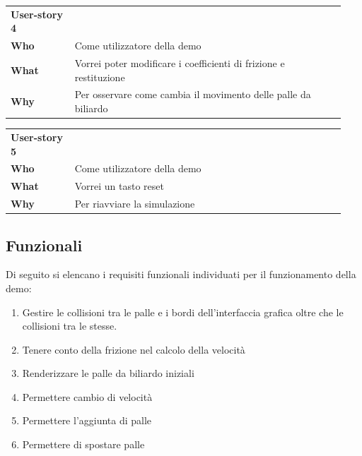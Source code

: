 \begin{table}[H]
    \begin{tabular}{p{0.18\linewidth}p{0.76\linewidth}}
        \toprule
        \textbf{User-story 4} &                                                                   \\
        \textbf{Who}          & Come utilizzatore della demo                                      \\
        \textbf{What}         & Vorrei poter modificare i coefficienti di frizione e restituzione \\
        \textbf{Why}          & Per osservare come cambia il movimento delle palle da biliardo    \\
        \bottomrule
    \end{tabular}\label{tab:user-story-4}
\end{table}
\begin{table}[H]
    \begin{tabular}{p{0.18\linewidth}p{0.76\linewidth}}
        \toprule
        \textbf{User-story 5} &                              \\
        \textbf{Who}          & Come utilizzatore della demo \\
        \textbf{What}         & Vorrei un tasto reset        \\
        \textbf{Why}          & Per riavviare la simulazione \\
        \bottomrule
    \end{tabular}\label{tab:user-story-5}
\end{table}

\subsection{Funzionali}\label{subsec:demo-funzionali}
Di seguito si elencano i requisiti funzionali individuati per il funzionamento della demo:
\begin{enumerate}[label=\textbf{\ref{subsec:demo-funzionali}.\arabic*}]
    \item \label{itm:df1} Gestire le collisioni tra le palle e i bordi dell'interfaccia grafica oltre che le collisioni
    tra le stesse.
    \item \label{itm:df2} Tenere conto della frizione nel calcolo della velocità
    \item \label{itm:df3} Renderizzare le palle da biliardo iniziali
    \item \label{itm:df4} Permettere cambio di velocità
    \item \label{itm:df5} Permettere l'aggiunta di palle
    \item \label{itm:df6} Permettere di spostare palle
\end{enumerate}


